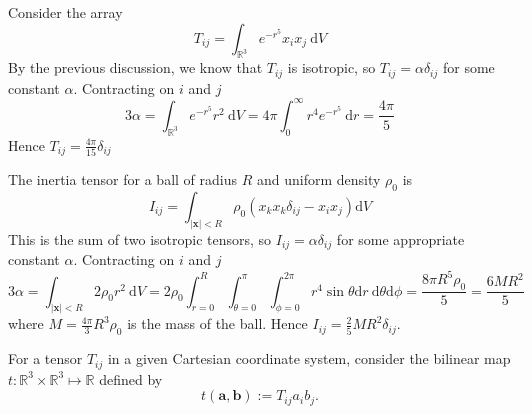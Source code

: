 \begin{example}
    Consider the array
    \[
    T_{i j}=\int_{\mathbb{R}^{3}} e^{-r^{5}} x_{i} x_{j} \mathrm{~d} V
    \]
    By the previous discussion, we know that $T_{i j}$ is isotropic, so $T_{i j}=\alpha \delta_{i j}$ for some constant $\alpha$. Contracting on $i$ and $j$
    \[
    3 \alpha=\int_{\mathbb{R}^{3}} e^{-r^{5}} r^{2} \mathrm{~d} V=4 \pi \int_{0}^{\infty} r^{4} e^{-r^{5}} \mathrm{~d} r=\frac{4 \pi}{5}
    \]
    Hence $T_{i j}=\frac{4 \pi}{15} \delta_{i j}$
\end{example}
\begin{example}
    The inertia tensor for a ball of radius $R$ and uniform density $\rho_{0}$ is
    \[
    I_{i j}=\int_{|\mathbf{x}|<R} \rho_{0}\left(x_{k} x_{k} \delta_{i j}-x_{i} x_{j}\right) \mathrm{d} V
    \]
    This is the sum of two isotropic tensors, so $I_{i j}=\alpha \delta_{i j}$ for some appropriate constant $\alpha$. Contracting on $i$ and $j$
    \[
    3 \alpha=\int_{|\mathbf{x}|<R} 2 \rho_{0} r^{2} \mathrm{~d} V=2 \rho_{0} \int_{r=0}^{R} \int_{\theta=0}^{\pi} \int_{\phi=0}^{2 \pi} r^{4} \sin \theta \mathrm{d} r \mathrm{~d} \theta \mathrm{d} \phi=\frac{8 \pi R^{5} \rho_{0}}{5}=\frac{6 M R^{2}}{5}
    \]
    where $M=\frac{4 \pi}{3} R^{3} \rho_{0}$ is the mass of the ball. Hence $I_{i j}=\frac{2}{5} M R^{2} \delta_{i j}$.
\end{example}

For a tensor $T_{i j}$ in a given Cartesian coordinate system, consider the bilinear map $t: \mathbb{R}^{3} \times \mathbb{R}^{3} \mapsto \mathbb{R}$ defined by
\[
t(\mathbf{a}, \mathbf{b}):=T_{i j} a_{i} b_{j}.
\]